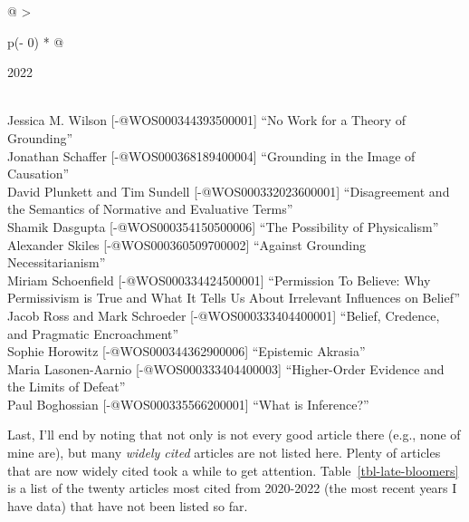 \documentclass[
  10pt,
  letterpaper,
  DIV=11,
  numbers=noendperiod,
  twoside]{scrartcl}
\begin{document}
\begin{longtable}[]{@{}
  >{\raggedright\arraybackslash}p{(\columnwidth - 0\tabcolsep) * }@{}}

\caption{\label{tbl-top-ten-2013}Most cited articles published less than
ten years ago as of 2022.}

\tabularnewline

\toprule\noalign{}
\begin{minipage}[b]{\linewidth}\raggedright
2022
\end{minipage} \\
\midrule\noalign{}
\endhead
\bottomrule\noalign{}
\endlastfoot
Jessica M. Wilson {[}-@WOS000344393500001{]} ``No Work for a Theory of
Grounding'' \\
Jonathan Schaffer {[}-@WOS000368189400004{]} ``Grounding in the Image of
Causation'' \\
David Plunkett and Tim Sundell {[}-@WOS000332023600001{]} ``Disagreement
and the Semantics of Normative and Evaluative Terms'' \\
Shamik Dasgupta {[}-@WOS000354150500006{]} ``The Possibility of
Physicalism'' \\
Alexander Skiles {[}-@WOS000360509700002{]} ``Against Grounding
Necessitarianism'' \\
Miriam Schoenfield {[}-@WOS000334424500001{]} ``Permission To Believe:
Why Permissivism is True and What It Tells Us About Irrelevant
Influences on Belief'' \\
Jacob Ross and Mark Schroeder {[}-@WOS000333404400001{]} ``Belief,
Credence, and Pragmatic Encroachment'' \\
Sophie Horowitz {[}-@WOS000344362900006{]} ``Epistemic Akrasia'' \\
Maria Lasonen-Aarnio {[}-@WOS000333404400003{]} ``Higher-Order Evidence
and the Limits of Defeat'' \\
Paul Boghossian {[}-@WOS000335566200001{]} ``What is Inference?'' \\

\end{longtable}

Last, I'll end by noting that not only is not every good article there
(e.g., none of mine are), but many \emph{widely cited} articles are not
listed here. Plenty of articles that are now widely cited took a while
to get attention. Table~\ref{tbl-late-bloomers} is a list of the twenty
articles most cited from 2020-2022 (the most recent years I have data)
that have not been listed so far.
\end{document}
